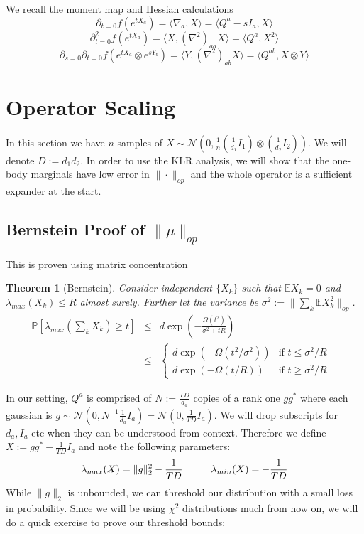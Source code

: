 \documentclass{article}
\newtheorem{theorem}{Theorem}
\newcommand{\E}{\mathbb{E}}
\renewcommand{\Pr}{\mathbb{P}}
\newcommand\cN{\mathcal{N}}
\begin{document}
We recall the moment map and Hessian calculations
\[ \partial_{t=0} f(e^{tX_{a}}) = \langle \nabla_{a}, X \rangle = \langle Q^{a} - sI_{a}, X \rangle   \]
\[ \partial_{t=0}^{2} f(e^{tX_{a}}) = \langle X, (\nabla^{2})_{aa} X \rangle = \langle Q^{a}, X^{2} \rangle  \]
\[ \partial_{s=0} \partial_{t=0} f(e^{tX_{a}} \otimes e^{sY_{b}}) = \langle Y, (\nabla^{2})_{ab} X \rangle = \langle Q^{ab}, X \otimes Y \rangle   \]

\section{Operator Scaling}
In this section we have $n$ samples of $X \sim \cN(0,\frac{1}{n} (\frac{1}{d_{1}} I_{1}) \otimes (\frac{1}{d_{2}} I_{2}))$. We will denote $D := d_{1} d_{2}$. In order to use the KLR analysis, we will show that the one-body marginals have low error in $\|\cdot\|_{op}$ and the whole operator is a sufficient expander at the start.

\subsection{Bernstein Proof of $\|\mu\|_{op}$}
This is proven using matrix concentration

\begin{theorem} [Bernstein]
Consider independent $\{X_{k}\}$ such that $\E X_{k} = 0$ and $\lambda_{max}(X_{k}) \leq R$ almost surely. Further let the variance be $\sigma^{2} := \|\sum_{k} \E X_{k}^{2} \|_{op}$.
\begin{eqnarray*} \Pr [ \lambda_{max} \left( \sum_{k} X_{k}  \right) \geq t ] & \leq & d \exp\left( - \frac{\Omega(t^{2})}{\sigma^{2} + t R} \right)
\\ & \leq & \begin{cases}
d \exp ( - \Omega(t^{2}/\sigma^{2}) ) & \text{if $t \leq \sigma^{2}/R$ }
\\ d \exp ( - \Omega(t/R) )           & \text{if $t \geq \sigma^{2}/R$}
\end{cases}
\end{eqnarray*}
\end{theorem}

In our setting, $Q^{a}$ is comprised of $N := \frac{TD}{d_{a}}$ copies of a rank one $g g^{*}$ where each gaussian is $g \sim \mathcal{N}(0, N^{-1} \frac{1}{d_{a}} I_{a} ) = \mathcal{N}(0, \frac{1}{TD} I_{a}) $. We will drop subscripts for $d_{a}, I_{a}$ etc when they can be understood from context. Therefore we define $X := g g^{*} - \frac{1}{TD} I_{a}$ and note the following parameters:
\[ \lambda_{max}(X) = \|g\|_{2}^{2} - \frac{1}{TD} \hspace{10mm} \lambda_{min}(X) = - \frac{1}{TD}   \]
While $\|g\|_{2}$ is unbounded, we can threshold our distribution with a small loss in probability. Since we will be using $\chi^{2}$ distributions much from now on, we will do a quick exercise to prove our threshold bounds:
\end{document}
